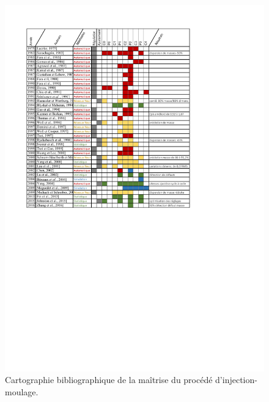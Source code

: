 \begin{figure}[hbtp]
	\centering
	\includegraphics[width=\textwidth,height=\textheight,keepaspectratio]{../Chap1/Figures/TableauComparaisonEssais.pdf}
	\caption{Cartographie bibliographique de la maîtrise du procédé d'injection-moulage.}
	\label{tab:state_art_compare}
\end{figure}


